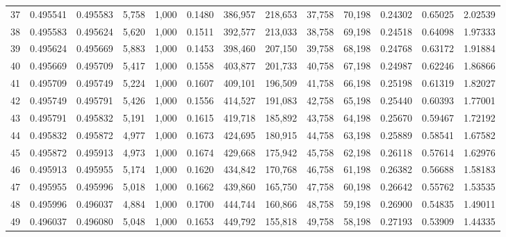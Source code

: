 \begin{tabular}{rrrrrrrrrrrrr}
37  &  0.495541 &  0.495583 &   5,758 &  1,000 &                                     0.1480 &  386,957 &  218,653 &   37,758 &   70,198 &  0.24302 &  0.65025 &  2.02539 \\
38  &  0.495583 &  0.495624 &   5,620 &  1,000 &                                     0.1511 &  392,577 &  213,033 &   38,758 &   69,198 &  0.24518 &  0.64098 &  1.97333 \\
39  &  0.495624 &  0.495669 &   5,883 &  1,000 &                                     0.1453 &  398,460 &  207,150 &   39,758 &   68,198 &  0.24768 &  0.63172 &  1.91884 \\
40  &  0.495669 &  0.495709 &   5,417 &  1,000 &                                     0.1558 &  403,877 &  201,733 &   40,758 &   67,198 &  0.24987 &  0.62246 &  1.86866 \\
41  &  0.495709 &  0.495749 &   5,224 &  1,000 &                                     0.1607 &  409,101 &  196,509 &   41,758 &   66,198 &  0.25198 &  0.61319 &  1.82027 \\
42  &  0.495749 &  0.495791 &   5,426 &  1,000 &                                     0.1556 &  414,527 &  191,083 &   42,758 &   65,198 &  0.25440 &  0.60393 &  1.77001 \\
43  &  0.495791 &  0.495832 &   5,191 &  1,000 &                                     0.1615 &  419,718 &  185,892 &   43,758 &   64,198 &  0.25670 &  0.59467 &  1.72192 \\
44  &  0.495832 &  0.495872 &   4,977 &  1,000 &                                     0.1673 &  424,695 &  180,915 &   44,758 &   63,198 &  0.25889 &  0.58541 &  1.67582 \\
45  &  0.495872 &  0.495913 &   4,973 &  1,000 &                                     0.1674 &  429,668 &  175,942 &   45,758 &   62,198 &  0.26118 &  0.57614 &  1.62976 \\
46  &  0.495913 &  0.495955 &   5,174 &  1,000 &                                     0.1620 &  434,842 &  170,768 &   46,758 &   61,198 &  0.26382 &  0.56688 &  1.58183 \\
47  &  0.495955 &  0.495996 &   5,018 &  1,000 &                                     0.1662 &  439,860 &  165,750 &   47,758 &   60,198 &  0.26642 &  0.55762 &  1.53535 \\
48  &  0.495996 &  0.496037 &   4,884 &  1,000 &                                     0.1700 &  444,744 &  160,866 &   48,758 &   59,198 &  0.26900 &  0.54835 &  1.49011 \\
49  &  0.496037 &  0.496080 &   5,048 &  1,000 &                                     0.1653 &  449,792 &  155,818 &   49,758 &   58,198 &  0.27193 &  0.53909 &  1.44335 \\

\end{tabular}
